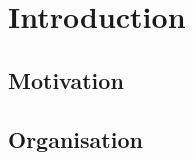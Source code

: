 
\chapter{Introduction}
\label{cha:intro}

\section{Motivation}
\label{sec:motivation}

\section{Organisation}
\label{sec:organisation}

